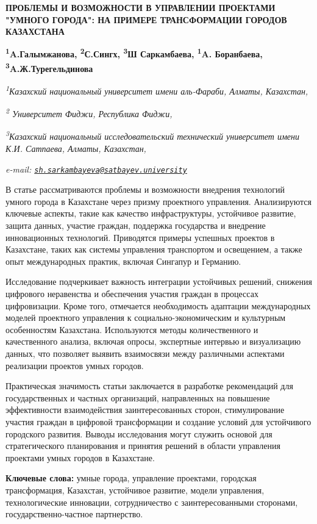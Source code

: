 {\bfseries ПРОБЛЕМЫ И ВОЗМОЖНОСТИ В УПРАВЛЕНИИ ПРОЕКТАМИ "УМНОГО ГОРОДА":
НА ПРИМЕРЕ ТРАНСФОРМАЦИИ ГОРОДОВ КАЗАХСТАНА}

{\bfseries \textsuperscript{1}A.Галымжанова, \textsuperscript{2}С.Сингх,
\textsuperscript{3}Ш Саркамбаева\textsuperscript{\envelope },
\textsuperscript{1}A. Боранбаева, \textsuperscript{3}A.Ж.Турегельдинова}

\emph{\textsuperscript{1}Казахский национальный университет имени
аль-Фараби, Алматы, Казахстан,}

\emph{\textsuperscript{2} Университет Фиджи, Республика Фиджи,}

\emph{\textsuperscript{3}Казахский национальный исследовательский
технический университет имени К.И. Сатпаева, Алматы, Казахстан,}

\emph{e-mail:
\href{mailto:sh.sarkambayeva@satbayev.university}{\nolinkurl{sh.sarkambayeva@satbayev.university}}}

В статье рассматриваются проблемы и возможности внедрения технологий
умного города в Казахстане через призму проектного управления.
Анализируются ключевые аспекты, такие как качество инфраструктуры,
устойчивое развитие, защита данных, участие граждан, поддержка
государства и внедрение инновационных технологий. Приводятся примеры
успешных проектов в Казахстане, таких как системы управления транспортом
и освещением, а также опыт международных практик, включая Сингапур и
Германию.

Исследование подчеркивает важность интеграции устойчивых решений,
снижения цифрового неравенства и обеспечения участия граждан в процессах
цифровизации. Кроме того, отмечается необходимость адаптации
международных моделей проектного управления к социально-экономическим и
культурным особенностям Казахстана. Используются методы количественного
и качественного анализа, включая опросы, экспертные интервью и
визуализацию данных, что позволяет выявить взаимосвязи между различными
аспектами реализации проектов умных городов.

Практическая значимость статьи заключается в разработке рекомендаций для
государственных и частных организаций, направленных на повышение
эффективности взаимодействия заинтересованных сторон, стимулирование
участия граждан в цифровой трансформации и создание условий для
устойчивого городского развития. Выводы исследования могут служить
основой для стратегического планирования и принятия решений в области
управления проектами умных городов в Казахстане.

{\bfseries Ключевые слова:} умные города, управление проектами, городская
трансформация, Казахстан, устойчивое развитие, модели управления,
технологические инновации, сотрудничество с заинтересованными сторонами,
государственно-частное партнерство.

